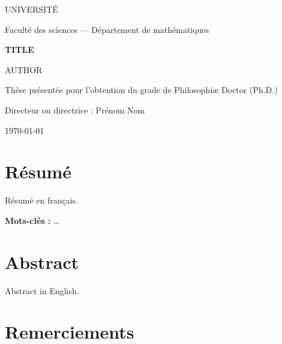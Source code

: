 \documentclass[12pt,oneside]{report}
\theoremstyle{plain}
\theoremstyle{definition}
\theoremstyle{remark}
\begin{document}
\begin{titlepage}
  \centering
  {\large UNIVERSITÉ\par}
  {\large Faculté des sciences — Département de mathématiques\par}
  \vspace{3cm}
  {\LARGE\bfseries {{TITLE}}\par}
  \vspace{2cm}
  {\Large {{AUTHOR}}\par}
  \vspace{1.5cm}
  Thèse présentée pour l'obtention du grade de Philosophiæ Doctor (Ph.D.)\par
  \vfill
  {\large Directeur ou directrice : Prénom Nom\par}
  \vspace{1cm}
  {\large \today\par}
\end{titlepage}

\chapter*{Résumé}
Résumé en français.

\textbf{Mots-clés :} \dots

\chapter*{Abstract}
\begin{otherlanguage}{english}Abstract in English.\end{otherlanguage}

\chapter*{Remerciements}

\tableofcontents
\listoffigures

\cleardoublepage
{}





\appendix




\end{document}
